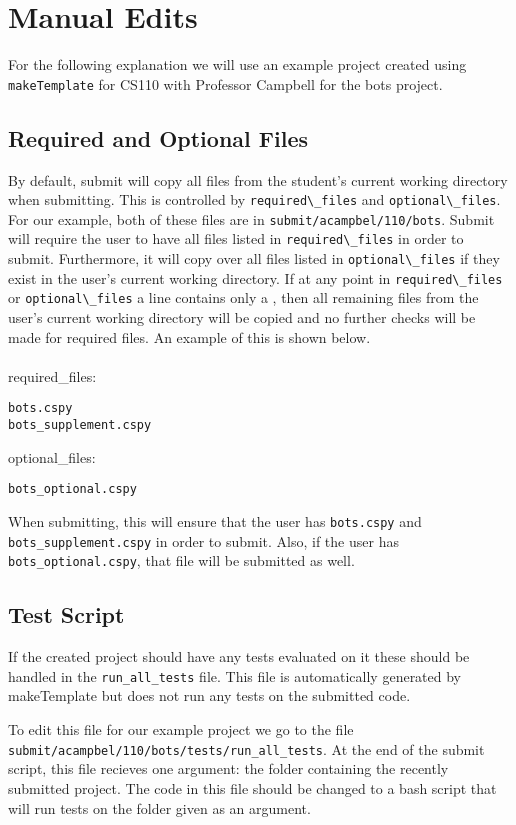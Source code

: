 \documentclass{article}
\begin{document}
\section{Manual Edits}
For the following explanation we will use an example project created using \verb|makeTemplate| for CS110 with Professor Campbell for the bots project.
\subsection{Required and Optional Files}
By default, submit will copy all files from the student's current working directory when submitting. This is controlled by \verb|required\_files| and \verb|optional\_files|. For our example, both of these files are in \verb|submit/acampbel/110/bots|. Submit will require the user to have all files listed in \verb|required\_files| in order to submit. Furthermore, it will copy over all files listed in \verb|optional\_files| if they exist in the user's current working directory. If at any point in \verb|required\_files| or \verb|optional\_files| a line contains only a \*, then all remaining files from the user's current working directory will be copied and no further checks will be made for required files. An example of this is shown below.\\ \\
required\_files:
\begin{verbatim}
bots.cspy
bots_supplement.cspy
\end{verbatim}
optional\_files:
\begin{verbatim}
bots_optional.cspy
\end{verbatim}
When submitting, this will ensure that the user has \verb|bots.cspy| and \verb|bots_supplement.cspy| in order to submit. Also, if the user has \verb|bots_optional.cspy|, that file will be submitted as well.

\subsection{Test Script}
If the created project should have any tests evaluated on it these should be handled in the \verb|run_all_tests| file. This file is automatically generated by makeTemplate but does not run any tests on the submitted code.

To edit this file for our example project we go to the file \verb|submit/acampbel/110/bots/tests/run_all_tests|. At the end of the submit script, this file recieves one argument: the folder containing the recently submitted project. The code in this file should be changed to a bash script that will run tests on the folder given as an argument.
\end{document}
